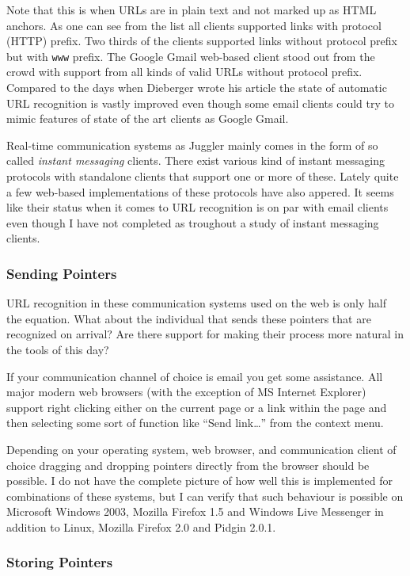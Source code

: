 \documentclass[12pt,a4paper]{article}
\begin{document}
Note that this is when URLs are in plain text and not marked up as
HTML anchors. As one can see from the list all clients supported links with
protocol (HTTP) prefix. Two thirds of the clients supported links without
protocol prefix but with \texttt{www} prefix. The Google Gmail web-based
client stood out from the crowd with support from all kinds of valid URLs
without protocol prefix. Compared to the days when Dieberger wrote his
article the state of automatic
URL recognition is vastly improved even though some email clients could try to
mimic features of state of the art clients as Google Gmail. 

Real-time communication systems as Juggler mainly comes in the form of so
called \emph{instant messaging} clients. There exist various kind of instant
messaging protocols with standalone clients that support one or more of these.
Lately quite a few web-based implementations of these protocols have also
appered. It seems like their status when it comes to URL recognition is on
par with email clients even though I have not completed as troughout a study
of instant messaging clients.

\subsubsection{Sending Pointers}

URL recognition in these communication systems used on the web is only half
the equation. What about the individual that sends these pointers that are
recognized on arrival? Are there support for making their process more natural
in the tools of this day?

If your communication channel of choice is email you get some assistance. All
major modern web browsers (with the exception of MS Internet Explorer)
support right clicking either on the current page or
a link within the page and then selecting some sort of function like ``Send
link\ldots'' from the context menu.

Depending on your operating system, web browser, and communication
client of choice dragging and dropping pointers directly from the browser
should be possible. I do not have the complete picture of how well this is
implemented for combinations of these systems, but I can verify that such
behaviour is possible on Microsoft Windows 2003, Mozilla Firefox 1.5 and
Windows Live Messenger in addition to Linux, Mozilla Firefox 2.0 and Pidgin
2.0.1.

\subsubsection{Storing Pointers}
\end{document}
